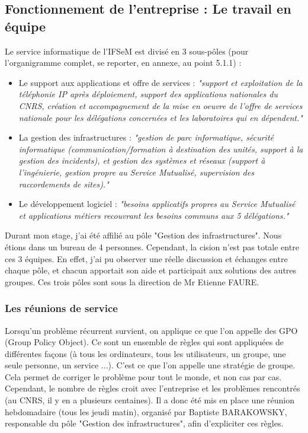 \subsection{Fonctionnement de l'entreprise : Le travail en équipe}

Le service informatique de l'IFSeM est divisé en 3 sous-pôles (pour l'organigramme complet, se reporter, en annexe, au point 5.1.1) : 
\begin{itemize}
    \item Le support aux applications et offre de services : \textit{"support et exploitation de la téléphonie IP après déploiement, support des applications nationales du CNRS, création et accompagnement de la mise en oeuvre de l’offre de services nationale pour les délégations concernées et les laboratoires qui en dépendent.\footnotemark[3]"}
    \item La gestion des infrastructures : \textit{"gestion de parc informatique, sécurité informatique (communication/formation à destination des unités, support à la gestion des incidents), et gestion des systèmes et réseaux (support à l’ingénierie, gestion propre au Service Mutualisé, supervision des raccordements de sites).\footnotemark[3]"}
    \item Le développement logiciel : \textit{"besoins applicatifs propres au Service Mutualisé et applications métiers recouvrant les besoins communs aux 5 délégations.\footnotemark[3]"}
\end{itemize}
\smallbreak
Durant mon stage, j'ai été affilié au pôle "Gestion des infrastructures". Nous étions dans un bureau de 4 personnes. Cependant, la cision n'est pas totale entre ces 3 équipes. En effet, j'ai pu observer une réelle discussion et échanges entre chaque pôle, et chacun apportait son aide et participait aux solutions des autres groupes. 
Ces trois pôles sont sous la direction de Mr Etienne FAURE.


\subsubsection{Les réunions de service}
Lorsqu'un problème récurrent survient, on applique ce que l'on appelle des GPO (Group Policy Object). Ce sont un ensemble de règles qui sont appliquées de différentes façons (à tous les ordinateurs, tous les utilisateurs, un groupe, une seule personne, un service ...). C'est ce que l'on appelle une stratégie de groupe. Cela permet de corriger le problème pour tout le monde, et non cas par cas. 
Cependant, le nombre de règles croit avec l'entreprise et les problèmes rencontrés (au CNRS, il y en a plusieurs centaines). Il a donc été mis en place une réunion hebdomadaire (tous les jeudi matin), organisé par Baptiste BARAKOWSKY, responsable du pôle "Gestion des infrastructures", afin d'expliciter ces règles.
\newpage

